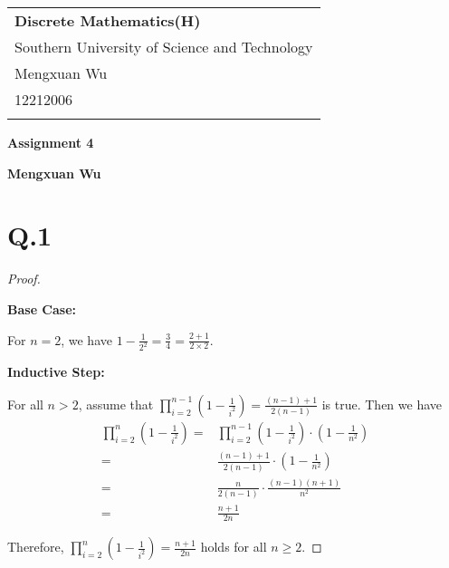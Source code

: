 \documentclass[a4paper,12pt]{article}
\begin{document}
\thispagestyle{empty} %

\begin{tabular}{p{15.5cm}}
{\large \bf Discrete Mathematics(H)} \\
Southern University of Science and Technology \\ Mengxuan Wu \\ 12212006 \\
\hline
\\
\end{tabular}

\vspace*{0.3cm} %

\begin{center}
	{\Large \bf Assignment 4}
	\vspace{2mm}

	{\bf Mengxuan Wu}
		
\end{center}  

\vspace{0.4cm}

\section*{Q.1}

\begin{proof}
$ $

\textbf{Base Case:}

For $n = 2$, we have $1 - \frac{1}{2^2} = \frac{3}{4} = \frac{2+1}{2\times2}$.

\textbf{Inductive Step:}

For all $n > 2$, assume that $\prod_{i = 2}^{n - 1} \left(1 - \frac{1}{i^2}\right) = \frac{(n - 1) + 1}{2(n - 1)}$ is true.
Then we have
\begin{align*}
	\prod_{i = 2}^{n} \left(1 - \frac{1}{i^2}\right) =& \prod_{i = 2}^{n - 1} \left(1 - \frac{1}{i^2}\right) \cdot \left(1 - \frac{1}{n^2}\right) \\
	=& \frac{(n - 1) + 1}{2(n - 1)} \cdot \left(1 - \frac{1}{n^2}\right) \\
	=& \frac{n}{2(n - 1)} \cdot \frac{(n - 1)(n + 1)}{n^2} \\
	=& \frac{n + 1}{2n}
\end{align*}

Therefore, $\prod_{i = 2}^{n} \left(1 - \frac{1}{i^2}\right) = \frac{n + 1}{2n}$ holds for all $n \geq 2$.
\end{proof}
\end{document}
